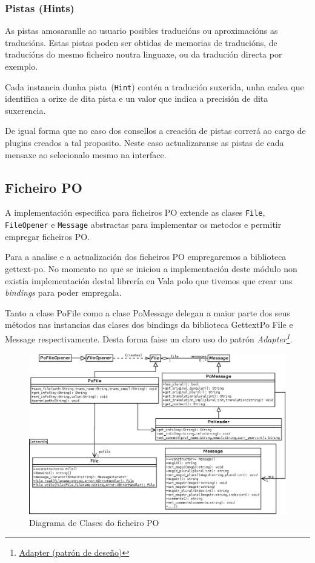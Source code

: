 \subsubsection{Pistas (Hints)}
As pistas amosaranlle ao usuario posibles traducións ou aproximacións as traducións. Estas pistas poden ser obtidas de memorias de traducións, de traducións do mesmo ficheiro noutra linguaxe, ou da tradución directa por exemplo.

Cada instancia dunha pista~(\lstinline{Hint}) contén a tradución suxerida, unha cadea que identifica a orixe de dita pista e un valor que indica a precisión de dita suxerencia.

De igual forma que no caso dos consellos a creación de pistas correrá ao cargo de plugins creados a tal proposito. Neste caso actualizaranse as pistas de cada mensaxe ao selecionalo mesmo na interface.

\subsection{Ficheiro PO}
A implementación especifica para ficheiros PO extende as clases \lstinline{File}, \lstinline{FileOpener} e \lstinline{Message} abstractas para implementar os metodos e permitir empregar ficheiros PO.

Para a analise e a actualización dos ficheiros PO empregaremos a biblioteca gettext-po. No momento no que se iniciou a implementación deste módulo non existía implementación destal librería en Vala polo que tivemos que crear uns \emph{bindings} para poder empregala.

Tanto a clase PoFile como a clase PoMessage delegan a maior parte dos seus métodos nas instancias das clases dos bindings da biblioteca GettextPo File e Message respectivamente. Desta forma faise un claro uso do patrón \emph{Adapter\footnote{\href{http://gl.wikipedia.org/wiki/Adapter_\%28patr\%C3\%B3n_de_dese\%C3\%B1o\%29}{Adapter (patrón de deseño)}}}.

\begin{figure}[h!]
    \centering
    \includegraphics[width=\textwidth]{img/pofile.png}
    \caption{Diagrama de Clases do ficheiro PO}
    \label{fig:dia_class:pofile}
\end{figure}

